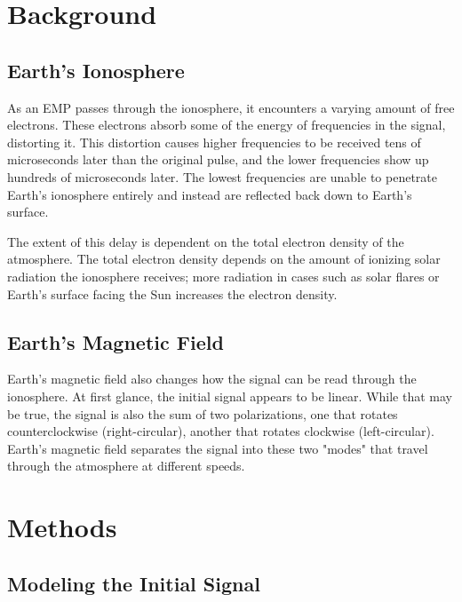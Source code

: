 \documentclass[12pt, reqno]{amsart}
\begin{document}

\section{Background}
\subsection{Earth's Ionosphere}

\noindent As an EMP passes through the ionosphere, it encounters a varying amount of free electrons. These electrons absorb some of the energy of frequencies in the signal, distorting it. This distortion causes higher frequencies to be received tens of microseconds later than the original pulse, and the lower frequencies show up hundreds of microseconds later. The lowest frequencies are unable to penetrate Earth's ionosphere entirely and instead are reflected back down to Earth's surface.

\noindent The extent of this delay is dependent on the total electron density of the atmosphere. The total electron density depends on the amount of ionizing solar radiation the ionosphere receives; more radiation in cases such as solar flares or Earth's surface facing the Sun increases the electron density.

\subsection{Earth's Magnetic Field}

\noindent Earth's magnetic field also changes how the signal can be read through the ionosphere. At first glance, the initial signal appears to be linear. While that may be true, the signal is also the sum of two polarizations, one that rotates counterclockwise (right-circular), another that rotates clockwise (left-circular). Earth's magnetic field separates the signal into these two "modes" that travel through the atmosphere at different speeds.


\section{Methods}
\subsection{Modeling the Initial Signal}
\end{document}
